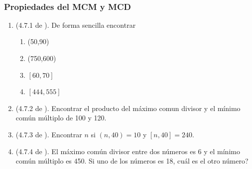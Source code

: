 \newpage
\begin{exers}{\ \\}
	\begin{center}
		\vspace{-1cm}
		\subsubsection*{ Propiedades del MCM y MCD }\label{ejercicios_subsubsection_propiedades_de_MCM_MCD}
	\end{center}

	\begin{enumerate}
		\item (4.7.1 de \cite{Aops_TN}). De forma sencilla encontrar 
				\begin{enumerate}[label=\Alph*)]
						\item (50,90)
						\item (750,600)
						\item $[60,70]$
						\item $[444,555]$																		
				\end{enumerate}
		\item (4.7.2 de \cite{Aops_TN}). Encontrar el producto del máximo comun divisor y el mínimo común múltiplo de 100 y 120.
		\item (4.7.3 de \cite{Aops_TN}). Encontrar $n$ si $(n,40)=10$ y $[n,40]=240$.
		\item (4.7.4 de \cite{Aops_TN}). El máximo común divisor entre dos números es 6 y  el mínimo común múltiplo es 450. Si uno de los números es 18, cuál es el otro número?
	\end{enumerate}
\end{exers}
\newpage


